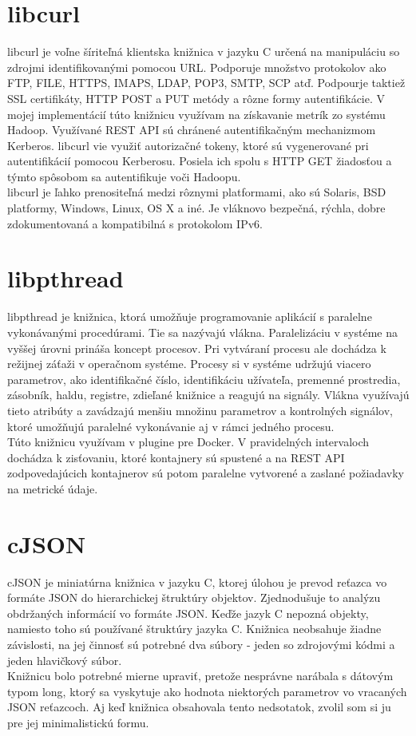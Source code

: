\documentclass[11pt,final,oneside]{fithesis}
\begin{document}
\section{libcurl}
libcurl je voľne šíriteľná klientska knižnica v jazyku C určená na manipuláciu so zdrojmi identifikovanými pomocou URL. Podporuje
množstvo protokolov ako FTP, FILE, HTTPS, IMAPS, LDAP, POP3, SMTP, SCP atď. Podpourje taktiež SSL certifikáty,
HTTP POST a PUT metódy a rôzne formy autentifikácie. V mojej implementácií túto knižnicu využívam na získavanie metrík zo systému
Hadoop. Využívané REST API sú chránené autentifikačným mechanizmom Kerberos. libcurl vie využiť autorizačné tokeny,
ktoré sú vygenerované pri autentifikácií pomocou Kerberosu. Posiela ich spolu s HTTP GET žiadosťou a týmto spôsobom
sa autentifikuje voči Hadoopu.
\\libcurl je ľahko prenositeľná medzi rôznymi platformami, ako sú Solaris, BSD platformy, Windows, Linux, OS X a iné. Je vláknovo
bezpečná, rýchla, dobre zdokumentovaná a kompatibilná s protokolom IPv6. \cite{24}

\section{libpthread}
libpthread je knižnica, ktorá umožňuje programovanie aplikácií s paralelne vykonávanými procedúrami. Tie sa nazývajú vlákna. Paralelizáciu
v systéme na vyššej úrovni prináša koncept procesov. Pri
vytváraní procesu ale dochádza k režijnej záťaži v operačnom systéme. Procesy si v systéme udržujú viacero parametrov, ako identifikačné
číslo, identifikáciu užívateľa, premenné prostredia, zásobník, haldu, registre, zdieľané knižnice a reagujú na signály. Vlákna využívajú
tieto atribúty a zavádzajú menšiu množinu parametrov a kontrolných signálov, ktoré umožňujú paralelné vykonávanie aj v rámci jedného procesu.
\\Túto knižnicu využívam v plugine pre Docker. V pravidelných intervaloch dochádza k zisťovaniu, ktoré kontajnery sú spustené a na REST API
zodpovedajúcich kontajnerov sú potom paralelne vytvorené a zaslané požiadavky na metrické údaje.

\section{cJSON}
cJSON je miniatúrna knižnica v jazyku C, ktorej úlohou je prevod reťazca vo formáte JSON do hierarchickej štruktúry objektov. Zjednodušuje
to analýzu obdržaných informácií vo formáte JSON. Keďže jazyk C nepozná
objekty, namiesto toho sú používané štruktúry jazyka C. Knižnica neobsahuje žiadne závislosti, na jej činnosť sú potrebné dva súbory - 
jeden so zdrojovými kódmi a jeden hlavičkový súbor.
\\Knižnicu bolo potrebné mierne upraviť, pretože nesprávne narábala s dátovým typom long, ktorý sa vyskytuje ako hodnota niektorých parametrov
vo vracaných JSON reťazcoch. Aj keď knižnica obsahovala tento nedsotatok, zvolil som si ju pre jej minimalistickú formu.
\end{document}
